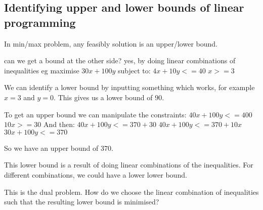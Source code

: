 
\subsection{Identifying upper and lower bounds of linear programming}

In min/max problem, any feasibly solution is an upper/lower bound.

can we get a bound at the other side?
yes, by doing linear combinations of inequalities
eg maximise
\(30x + 100y\)
subject to:
\(4x + 10y <= 40\)
\(x >=3 \)

We can identify a lower bound by inputting something which works, for example \(x=3\) and \(y=0\). This gives us a lower bound of \(90\).

To get an upper bound we can manipulate the constraints:
\(40x + 100y<=400\)
\(10x>=30\)
And then:
\(40x+100y<=370+30\)
\(40x+100y<=370+10x\)
\(30x+100y<=370\)

So we have an upper bound of \(370\).

This lower bound is a result of doing linear combinations of the inequalities. For different combinations, we could have a lower lower bound.

This is the dual problem. How do we choose the linear combination of inequalities such that the resulting lower bound is minimised?

